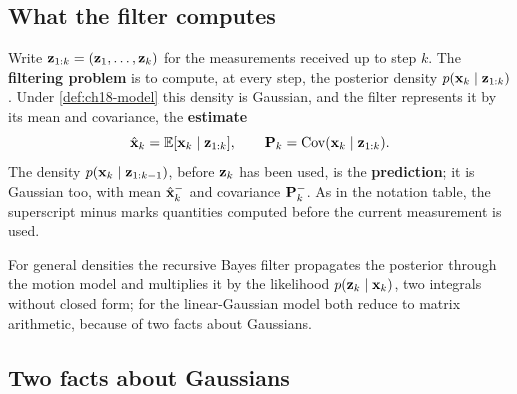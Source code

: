 \subsection{What the filter computes}

\begin{definition}
\label{def:ch18-filtering}
Write $\mathbf{z}_{1:k}=(\mathbf{z}_1,\dots,\mathbf{z}_k)$ for the measurements received up
to step $k$. The \textbf{filtering problem} is to
compute, at every step, the posterior density $p(\mathbf{x}_k\mid\mathbf{z}_{1:k})$.
Under \cref{def:ch18-model} this density is Gaussian, and the filter
represents it by its mean and covariance, the \textbf{estimate}
\begin{equation}
  \hat{\mathbf{x}}_k=\mathbb{E}[\mathbf{x}_k\mid\mathbf{z}_{1:k}],\qquad
  \mathbf{P}_k=\operatorname{Cov}(\mathbf{x}_k\mid\mathbf{z}_{1:k}).
  \label{eq:ch18-estimate}
\end{equation}
The density $p(\mathbf{x}_k\mid\mathbf{z}_{1:k-1})$, before $\mathbf{z}_k$ has been used,
is the \textbf{prediction}; it is Gaussian
too, with mean $\hat{\mathbf{x}}^-_k$ and covariance $\mathbf{P}^-_k$. As in the
notation table, the superscript minus marks quantities computed before the
current measurement is used.
\end{definition}

For general densities the recursive Bayes filter
\cite[ch.~2]{thrun2005probabilistic} propagates the posterior through the
motion model and multiplies it by the likelihood $p(\mathbf{z}_k\mid\mathbf{x}_k)$,
two integrals without closed form; for the linear-Gaussian model both reduce
to matrix arithmetic, because of two facts about Gaussians.

\subsection{Two facts about Gaussians}

